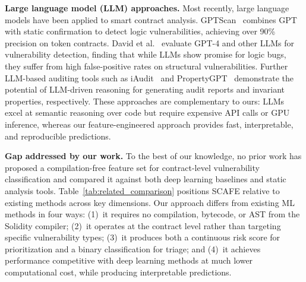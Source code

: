 \documentclass[11pt,a4paper]{article}
\newcommand{\MethodName}{SCAFE\xspace}
\begin{document}
\textbf{Large language model (LLM) approaches.}
Most recently, large language models have been applied to smart contract analysis.
GPTScan~\cite{sun2024gptscan} combines GPT with static confirmation to detect logic vulnerabilities, achieving over 90\% precision on token contracts.
David et al.~\cite{david2023llm} evaluate GPT-4 and other LLMs for vulnerability detection, finding that while LLMs show promise for logic bugs, they suffer from high false-positive rates on structural vulnerabilities.
Further LLM-based auditing tools such as iAudit~\cite{ma2024iaudit} and PropertyGPT~\cite{liu2024propertygpt} demonstrate the potential of LLM-driven reasoning for generating audit reports and invariant properties, respectively.
These approaches are complementary to ours: LLMs excel at semantic reasoning over code but require expensive API calls or GPU inference, whereas our feature-engineered approach provides fast, interpretable, and reproducible predictions.

\textbf{Gap addressed by our work.}
To the best of our knowledge, no prior work has proposed a compilation-free feature set for contract-level vulnerability classification and compared it against both deep learning baselines and static analysis tools.
Table~\ref{tab:related_comparison} positions \MethodName relative to existing methods across key dimensions.
Our approach differs from existing ML methods in four ways: (1)~it requires no compilation, bytecode, or AST from the Solidity compiler; (2)~it operates at the contract level rather than targeting specific vulnerability types; (3)~it produces both a continuous risk score for prioritization and a binary classification for triage; and (4)~it achieves performance competitive with deep learning methods at much lower computational cost, while producing interpretable predictions.
\end{document}

